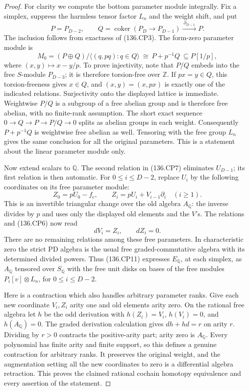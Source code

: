 \begin{proof}
For clarity we compute the bottom parameter module integrally.
Fix a simplex, suppress the harmless tensor factor \(L_n\)
and the weight shift, and put
\[
 P=P_{D-2},\qquad
 Q=\operatorname{coker}(P_D\to P_{D-1})
       \xrightarrow{\ \partial_{D-1}\ }P.
                                                               \tag{136.CP8}
\]
The inclusion follows from exactness of (136.CP3). The form-zero
parameter module is
\[
 M_0=(P\oplus Q)/\langle(q,pq):q\in Q\rangle
          \ \cong\ P+p^{-1}Q\ \subseteq P[1/p],          \tag{136.CP9}
\]
where \((x,y)\mapsto x-y/p\). To prove injectivity, note
that \(P/Q\) embeds into the free \(S\)-module
\(P_{D-3}\); it is therefore torsion-free over \(\mathbb Z\).
If \(px=y\in Q\), this torsion-freeness gives \(x\in Q\),
and \((x,y)=(x,px)\) is exactly one of the indicated relations.
Surjectivity onto the displayed lattice is immediate.
Weightwise \(P/Q\) is a subgroup of a free abelian group and
is therefore free abelian, with no finite-rank assumption.
The short exact sequence \(0\to Q\to P\to P/Q\to0\)
splits as abelian groups in each weight. Consequently
\(P+p^{-1}Q\) is weightwise free abelian as well. Tensoring
with the free group \(L_n\) gives the same conclusion for
all the original parameters. This is a statement about the
linear parameter module only.

Now extend scalars to \(\mathbb Q\). The second relation
in (136.CP7) eliminates \(U_{D-1}\); its first relation is
then automatic. For \(0\leq i\leq D-2\), replace \(U_i\)
by the following coordinates on its free parameter module:
\[
 Z_0=pU_0-f_e,\qquad
 Z_i=pU_i+V_{i-1}\partial_i\quad(i\geq1).               \tag{136.CP10}
\]
This is an invertible triangular change over the old algebra
\(A_{\mathbb Q}\): the inverse divides by \(p\) and uses
only the displayed old elements and the \(V\)'s. The
relations and (136.CP6) now read
\[
                      dV_i=Z_i,\qquad dZ_i=0.
                                                               \tag{136.CP11}
\]
There are no remaining relations among these free parameters.
In characteristic zero the strict PD algebra is the usual free
graded-commutative algebra with its determined divided powers.
Thus (136.CP11) expresses \(E_{\mathbb Q}\), at each simplex,
as \(A_{\mathbb Q}\) tensored over \(S_{\mathbb Q}\) with
the free unit disks on bases of the free modules
\(P_i[v]\otimes L_n\), for \(0\leq i\leq D-2\).

Here is a contraction which also handles arbitrary parameter
ranks. Give each new coordinate \(V_i,Z_i\) arity one and
old elements arity zero. On the rational free algebra let
\(h\) be the odd derivation with
\(h(Z_i)=V_i\), \(h(V_i)=0\), and \(h(A_{\mathbb Q})=0\).
The graded derivation calculation gives
\(dh+hd=r\) on arity \(r\). Dividing by \(r>0\) contracts
the positive-arity part; arity zero is \(A_{\mathbb Q}\).
Every polynomial has finite arity and finite support, so this
defines a genuine contraction for arbitrary ranks. It
preserves the original weight, and the augmentation setting
all the new coordinates to zero is a differential algebra
retraction. This proves the claimed rational cochain homotopy
equivalence and every assertion of the statement.
\end{proof}

